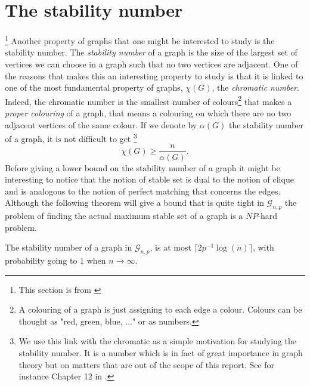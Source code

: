 \section{The stability number}\footnote{This section is from \cite{Bondy08}}
Another property of graphs that one might be interested to study is the stability number. The \emph{stability number} of a graph is the size of the largest set of vertices we can choose in a graph such that no two vertices are adjacent. 
One of the reasons that makes this an interesting property to study is that it is linked to one of the most fundamental property of graphs, $\chi (G)$, the \emph{chromatic number}. 
Indeed, the chromatic number is the smallest number of colours\footnote{A colouring of a graph is just assigning to each edge a colour. Colours can be thought as "red, green, blue, ..." or as numbers.} that makes a \emph{proper colouring} of a graph, 
that means a colouring on which there are no two adjacent vertices of the same colour. 
If we denote by $\alpha(G)$ the stability number of a graph, it is not difficult to get \footnote{ We use this link with the chromatic as a simple motivation for studying the stability number. It is a number which is in fact of great importance in graph theory but on matters that are out of the scope of this report. See for instance Chapter 12 in \cite{Bondy08}.}
\begin{equation}
	\chi(G) \geq \frac{n}{\alpha(G)}.
\end{equation}
Before giving a lower bound on the stability number of a graph it might be interesting to notice that the notion of stable set is dual to the notion of clique and is analogous to the notion of perfect matching that concerns the edges.
Although the following theorem will give a bound that is quite tight in $\mathcal{G}_{n, p}$ the problem of finding the actual maximum stable set of a graph is a $NP$-hard problem.
\begin{theorem}
	The stability number of a graph in $\mathcal{G}_{n, p}$, is at most $\lceil 2p^{-1}\log(n)\rceil$, with probability going to 1 when $n \longrightarrow \infty$.
\end{theorem}
